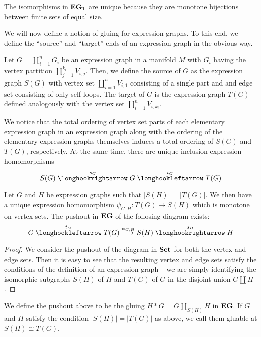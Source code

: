 \documentclass[./Thick_TQFTs_and_Quantum_Information.tex]{subfiles}
\begin{document}
\begin{rmk}
The isomorphisms in $\textbf{EG}_1$ are unique because they are monotone bijections
between finite sets of equal size.
\end{rmk}

We will now define a notion of gluing for expression graphs. To this end, we
define the ``source'' and ``target'' ends of an expression graph in the obvious
way.

\begin{defn}
Let $G = \coprod_{i = 1}^{n} G_i$ be an expression graph in a manifold $M$ with
$G_i$ having the vertex partition $\coprod_{j = 1}^{k_i} V_{i, j}$. Then, we
define the source of $G$ as the expression graph $S(G)$ with vertex set
$\coprod_{i = 1}^{n} V_{i, 1}$ consisting of a single part and and edge set
consisting of only self-loops. The target
of $G$ is the expression graph $T(G)$ defined analogously with the vertex set
$\coprod_{i = 1}^{n} V_{i, k_i}$.
\end{defn}

\begin{rmk}
We notice that the total ordering of vertex set parts of each elementary
expression graph in an expression graph along with the ordering of the elementary
expression graphs themselves induces a total ordering of $S(G)$ and $T(G)$,
respectively. At the same time, there are unique inclusion expression
homomorphisms
\[
  S(G) \hto[s_G] G \hot[t_G] T(G)
\]
\end{rmk}

\begin{lem}
Let $G$ and $H$ be expression graphs such that $|S(H)| = |T(G)|$.
We then have a unique expression homomorphism $\psi_{G, H} : T(G) \to S(H)$ which
is monotone on vertex sets. The pushout in $\textbf{EG}$ of the follosing diagram
exists:
\[
  G \hot[t_G] T(G) \to[\psi_{G, H}] S(H) \hto[s_H] H
\]
\end{lem}
\begin{proof}
We consider the pushout of the diagram in $\textbf{Set}$ for both the vertex and edge
sets. Then it is easy to see that the resulting vertex and edge sets satisfy the
conditions of the definition of an expression graph -- we are simply identifying
the isomorphic subgraphs $S(H)$ of $H$ and $T(G)$ of $G$ in the disjoint union
$G \amalg H$.
\end{proof}

\begin{defn}
We define the pushout above to be the gluing $H * G = G \amalg_{S(H)} H$ in
$\textbf{EG}$. If $G$ and $H$ satisfy the condition $|S(H)| = |T(G)|$ as above, we call
them gluable at $S(H) \cong T(G)$.
\end{defn}
\end{document}
